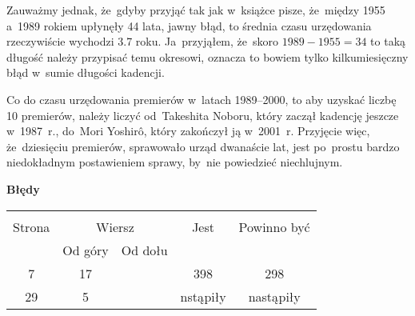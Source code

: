 \documentclass[a4paper,11pt]{article}  %
\newcommand{\tb}{\textbf}
\newcommand{\Center}[1]{\begin{center} #1 \end{center}}
\newcommand{\CenterTB}[1]{\Center{\tb{#1}}}
\begin{document}
Zauważmy jednak, że~gdyby przyjąć tak jak w~książce pisze, że~między
1955 a~1989 rokiem upłynęły 44 lata, jawny błąd, to średnia czasu
urzędowania rzeczywiście wychodzi 3.7 roku. Ja~przyjąłem, że~skoro
$1989 - 1955 = 34$ to taką długość należy przypisać temu okresowi,
oznacza to bowiem tylko kilkumiesięczny błąd w~sumie długości
kadencji.

Co do czasu urzędowania premierów w~latach 1989--2000, to aby uzyskać
liczbę 10 premierów, należy liczyć od~Takeshita Noboru, który zaczął
kadencję jeszcze w~1987~r., do~Mori Yoshir\^{o}, który zakończył ją
w~2001~r. Przyjęcie więc, że~dziesięciu premierów, sprawowało urząd
dwanaście lat, jest po~prostu bardzo niedokładnym postawieniem sprawy,
by~nie powiedzieć niechlujnym.

\CenterTB{Błędy}
\begin{center}
  \begin{tabular}{|c|c|c|c|c|}
    \hline
    & \multicolumn{2}{c|}{} & & \\
    Strona & \multicolumn{2}{c|}{Wiersz}& Jest & Powinno być \\ \cline{2-3}
    & Od góry & Od dołu &  &  \\
    \hline
    7   & 17 & & 398 & 298 \\
    29  &  5 & & nstąpiły & nastąpiły \\
    \hline
  \end{tabular}


\end{center}
\end{document}
